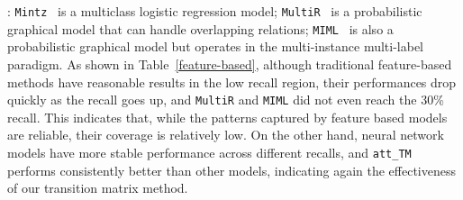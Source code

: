 
: \texttt{Mintz}~\cite{mintz2009distant} is a multiclass logistic regression model; \texttt{MultiR}~\cite{hoffmann2011knowledge} is a probabilistic graphical model that can handle overlapping relations; \texttt{MIML}~\cite{surdeanu2012multi} is also a probabilistic graphical model but operates in the multi-instance multi-label paradigm. As shown in Table~\ref{feature-based}, although traditional feature-based methods have reasonable results in the low recall region, their performances drop quickly as the recall goes up, and \texttt{MultiR} and \texttt{MIML} did not even reach the 30\% recall. This indicates that, while the patterns captured by feature based models are reliable, their coverage is relatively low. On the other hand, neural network models have more stable performance across different recalls, 
and \texttt{att\_TM} performs consistently better than other models, 
indicating again the effectiveness of our transition matrix method.






